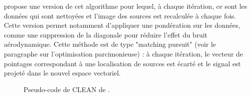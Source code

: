 \cite{Sijtsma2007} propose une version de cet algorithme pour lequel, à chaque itération, ce sont les données qui sont nettoyées et l'image des sources est recalculée à chaque fois. Cette version permet notamment d'appliquer une pondération sur les données, comme une suppression de la diagonale pour réduire l'effet du bruit aérodynamique. Cette méthode est de type "matching pursuit" (voir le paragraphe sur l'optimisation parcimonieuse) : à chaque itération, le vecteur de pointages correspondant à une localisation de sources est écarté et le signal est projeté dans le nouvel espace vectoriel.\\

\begin{figure}[!h]
	\centering
	\caption{Pseudo-code de CLEAN de \cite{Hogbom1974}. \label{clean_hogbom}}
\end{figure}


